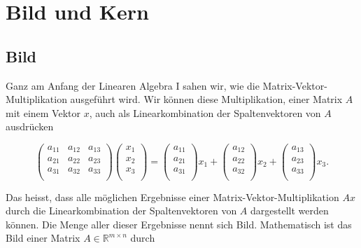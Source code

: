 \setcounter{section}{4}
\section{Bild und Kern}

\subsection{Bild}

Ganz am Anfang der Linearen Algebra I sahen wir, wie die Matrix-Vektor-Multiplikation ausgeführt wird. Wir können diese Multiplikation, einer Matrix \( A \) mit einem Vektor \( x \), auch als Linearkombination der Spaltenvektoren von \( A \) ausdrücken

\begin{equation*}
    \begin{pmatrix}
        a_{11} & a_{12} & a_{13} \\
        a_{21} & a_{22} & a_{23} \\
        a_{31} & a_{32} & a_{33} \\
    \end{pmatrix}
    \begin{pmatrix}
        x_1 \\
        x_2 \\
        x_3 \\
    \end{pmatrix} =   
    \begin{pmatrix}
        a_{11} \\
        a_{21} \\
        a_{31} \\
    \end{pmatrix} x_1 +
    \begin{pmatrix}
        a_{12} \\
        a_{22} \\
        a_{32} \\
    \end{pmatrix} x_2 +
    \begin{pmatrix}
        a_{13} \\
        a_{23} \\
        a_{33} \\
    \end{pmatrix} x_3.
\end{equation*}

\vspace{0.5\baselineskip}

Das heisst, dass alle möglichen Ergebnisse einer Matrix-Vektor-Multiplikation \( Ax \) durch die Linearkombination der Spaltenvektoren von \( A \) dargestellt werden können. Die Menge aller dieser Ergebnisse nennt sich Bild. Mathematisch ist das Bild einer Matrix \( A \in \mathbb{R}^{m \times n} \) durch

